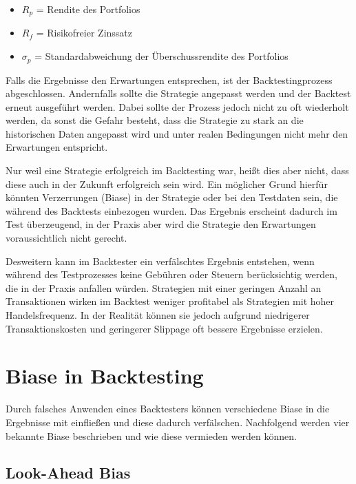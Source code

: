 \begin{itemize}
    \item $R_p$ = Rendite des Portfolios
    \item $R_f$ = Risikofreier Zinssatz
    \item $\sigma_p$ = Standardabweichung der Überschussrendite des Portfolios
\end{itemize}


Falls die Ergebnisse den Erwartungen entsprechen, ist der Backtestingprozess abgeschlossen.
Andernfalls sollte die Strategie angepasst werden und der Backtest erneut ausgeführt werden.
Dabei sollte der Prozess jedoch nicht zu oft wiederholt werden, da sonst die Gefahr besteht, dass die Strategie zu stark an die historischen Daten angepasst wird
und unter realen Bedingungen nicht mehr den Erwartungen entspricht.
\cite{HarveyLiu2013} \cite{Bailey2021BacktestOverfitting}

Nur weil eine Strategie erfolgreich im Backtesting war, heißt dies aber nicht, dass diese auch in der Zukunft erfolgreich sein wird. 
Ein möglicher Grund hierfür könnten Verzerrungen (Biase) in der Strategie oder bei den Testdaten sein, die während des Backtests einbezogen wurden. 
Das Ergebnis erscheint dadurch im Test überzeugend, in der Praxis aber wird die Strategie den Erwartungen voraussichtlich nicht gerecht. 
\cite{Bailey2014PseudoMath}

Desweitern kann im Backtester ein verfälschtes Ergebnis entstehen, wenn während des Testprozesses keine Gebühren oder Steuern berücksichtig werden, die in der Praxis anfallen würden.
Strategien mit einer geringen Anzahl an Transaktionen wirken im Backtest weniger profitabel als Strategien mit hoher Handelsfrequenz. 
In der Realität können sie jedoch aufgrund niedrigerer Transaktionskosten und geringerer Slippage oft bessere Ergebnisse erzielen.
\cite{ElBernoussi2023}

\section{Biase in Backtesting}
\label{sec:BiaseinBacktesting}

Durch falsches Anwenden eines Backtesters können verschiedene Biase in die Ergebnisse mit einfließen und diese dadurch verfälschen. 
Nachfolgend werden vier bekannte Biase beschrieben und wie diese vermieden werden können.

\subsection{Look-Ahead Bias}
\label{subsec:LookAheadBias}

